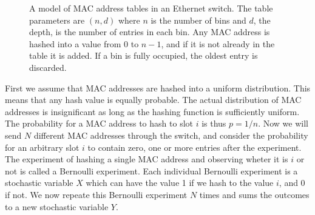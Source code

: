 \begin{figure}
\begin{center}
\end{center}

\caption{A model of MAC address tables in an Ethernet switch. The table parameters are
$(n,d)$ where $n$ is the number of bins and $d$, the depth,  is the number of entries in each bin.
Any MAC address is hashed into a value from $0$ to $n-1$, and if it is not already in the table it 
is added. If a bin is fully occupied, the oldest entry is discarded.}
\end{figure}


First we assume that MAC addresses are hashed into a uniform distribution. This means that any hash
value is equally probable. The actual distribution of MAC addresses is insignificant as long as the 
hashing function is sufficiently uniform. 
The probability for a MAC address to hash to slot $i$ is thus $p=1/n$. Now we will send $N$ different MAC addresses through
the switch, and
consider the probability for an arbitrary slot $i$ to contain zero, one or more entries after the experiment.
The experiment of hashing a single MAC address and observing wheter it is $i$ or not is called a Bernoulli experiment. 
Each individual Bernoulli experiment is a stochastic
variable $X$ which can have the value 1 if we hash to the value $i$, and 0 if not. 
We now repeate this Bernoulli experiment $N$ times and sums the outcomes to a new stochastic variable $Y$. 


